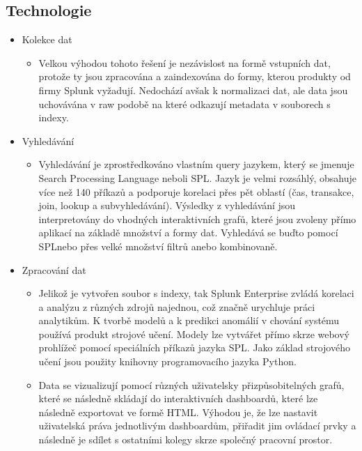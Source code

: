 \documentclass[czech,BP]{thesiskiv}
\begin{document}
\subsection{Technologie}
\begin{itemize}
	\item Kolekce dat
		\begin{itemize}
			\item Velkou výhodou tohoto řešení je nezávislost na formě vstupních dat, protože ty jsou zpracována a zaindexována do formy, kterou produkty od firmy Splunk vyžadují. Nedochází avšak k normalizaci dat, ale data jsou uchovávána v raw podobě na které odkazují metadata v souborech s indexy. 
		\end{itemize}
	\item Vyhledávání
		\begin{itemize}
			\item Vyhledávání je zprostředkováno vlastním query jazykem, který se jmenuje Search Processing Language neboli SPL\texttrademark. Jazyk je velmi rozsáhlý, obsahuje více než 140 příkazů a podporuje korelaci přes pět oblastí (čas, transakce, join, lookup a subvyhledávání). Výsledky z vyhledávání jsou interpretovány do vhodných interaktivních grafů, které jsou zvoleny přímo aplikací na základě množství a formy dat. Vyhledává se buďto pomocí SPL\texttrademark nebo přes velké množství filtrů anebo kombinovaně. 
		\end{itemize}
	\item Zpracování dat
		\begin{itemize}
			\item Jelikož je vytvořen soubor s indexy, tak Splunk Enterprise zvládá korelaci a analýzu z různých zdrojů najednou, což značně urychluje práci analytikům. K tvorbě modelů a k predikci anomálií v chování systému používá produkt strojové učení. Modely lze vytvářet přímo skrze webový prohlížeč pomocí speciálních příkazů jazyka SPL\texttrademark. Jako základ strojového učení jsou použity knihovny programovacího jazyka Python. \cite{MachineLearning}
			\item Data se vizualizují pomocí různých uživatelsky přizpůsobitelných grafů, které se následně skládají do interaktivních dashboardů, které lze následně exportovat ve formě HTML. Výhodou je, že lze nastavit uživatelská práva jednotlivým dashboardům, přiřadit jim ovládací prvky a následně je sdílet s ostatními kolegy skrze společný pracovní prostor.
		\end{itemize}
\end{itemize}
\end{document}
